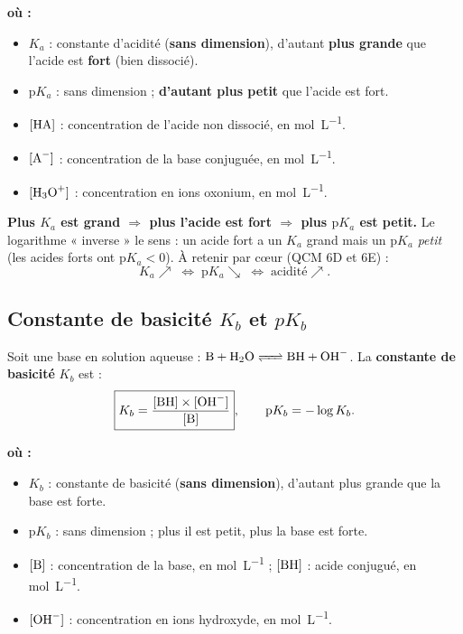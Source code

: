 \documentclass[11pt,a4paper]{article}
\newenvironment{ou}{%
  \par\smallskip\noindent\textbf{où :}\nopagebreak
  \begin{itemize}[leftmargin=1.8em,topsep=2pt,itemsep=1.5pt,parsep=0pt]}%
  {\end{itemize}}
\begin{document}
\begin{ou}
\item $K_a$ : constante d'acidité (\textbf{sans dimension}), d'autant \textbf{plus grande} que l'acide est
      \textbf{fort} (bien dissocié).
\item $\mathrm{p}K_a$ : sans dimension ; \textbf{d'autant plus petit} que l'acide est fort.
\item $[\ce{HA}]$ : concentration de l'acide non dissocié, en \si{mol.L^{-1}}.
\item $[\ce{A-}]$ : concentration de la base conjuguée, en \si{mol.L^{-1}}.
\item $[\ce{H3O+}]$ : concentration en ions oxonium, en \si{mol.L^{-1}}.
\end{ou}

\begin{attention}
\textbf{Plus $K_a$ est grand $\Rightarrow$ plus l'acide est fort $\Rightarrow$ plus $\mathrm{p}K_a$ est petit.}
Le logarithme « inverse » le sens : un acide fort a un $K_a$ grand mais un $\mathrm{p}K_a$ \emph{petit}
(les acides forts ont $\mathrm{p}K_a < 0$). À retenir par cœur (QCM 6D et 6E) :
\[ K_a \nearrow \;\Longleftrightarrow\; \mathrm{p}K_a \searrow \;\Longleftrightarrow\; \text{acidité} \nearrow. \]
\end{attention}

\subsection{Constante de basicité $K_b$ et $pK_b$}

\begin{formule}
Soit une base  en solution aqueuse : $\ce{B + H2O <=> BH + OH-}$. La \textbf{constante de basicité}
$K_b$ est :
\[ \boxed{K_b = \frac{[\ce{BH}]\times[\ce{OH-}]}{[\ce{B}]}}, \qquad \mathrm{p}K_b = -\log K_b. \]
\end{formule}

\begin{ou}
\item $K_b$ : constante de basicité (\textbf{sans dimension}), d'autant plus grande que la base est forte.
\item $\mathrm{p}K_b$ : sans dimension ; plus il est petit, plus la base est forte.
\item $[\ce{B}]$ : concentration de la base, en \si{mol.L^{-1}} ; $[\ce{BH}]$ : acide conjugué, en \si{mol.L^{-1}}.
\item $[\ce{OH-}]$ : concentration en ions hydroxyde, en \si{mol.L^{-1}}.
\end{ou}
\end{document}
